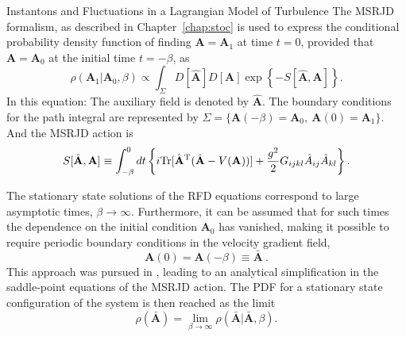 \begin{chapter}{Instantons and Fluctuations in a Lagrangian Model of Turbulence}
The MSRJD formalism, as described in Chapter~\ref{chap:stoc} is used to express the conditional probability density function of finding ${\mathbf{A}} = {\mathbf{A}}_1$ at time $t= 0$, provided that ${\mathbf{A}} = {\mathbf{A}}_0$ at the initial time $t= -\beta$, as
\begin{equation} \label{eq:rhoPDF}
 \rho ( {\mathbf{A}}_1 | {\mathbf{A}}_0, \beta ) \propto \int_{\Sigma} D[\hat {\mathbf{A}}] D[{\mathbf{A}}]  \exp \left\{ -S[\hat {\mathbf{A}}, {\mathbf{A}}] \right\} \mbox{.}
\end{equation}
In this equation: The auxiliary field is denoted by $\hat{\mathbf{A}}$. The boundary conditions for the path integral are represented by $\Sigma = \{ {\mathbf{A}}(-\beta) = {\mathbf{A}}_0, \ {\mathbf{A}}(0) = {\mathbf{A}}_1 \}$. And the MSRJD action is 
\begin{equation} \label{eq:rfd-action}
     S[\hat {\mathbf{A}}, {\mathbf{A}}] \equiv \int_{- \beta}^0 d t \left\{ i \mathrm{Tr}[\hat {\mathbf{A}}^{\mathrm{T}} ( \dot{\mathbf{A}} - V({\mathbf{A}}) ) ]
     + \frac{g^2}{2} G_{ijkl} \hat A_{ij} \hat A_{kl} \right\} \mbox{.}
\end{equation}

The stationary state solutions of the RFD equations correspond to large asymptotic times, $\beta \rightarrow \infty$. Furthermore, it can be assumed that for such times the dependence on the initial condition ${\mathbf{A}}_0$ has vanished, making it possible to require periodic boundary conditions in the velocity gradient field,
\begin{equation} \label{eq:boundary}
 {\mathbf{A}}(0) = {\mathbf{A}}(- \beta) \equiv \bar {\mathbf{A}} \ .
\end{equation}
This approach was pursued in \textcite{moriconi2014}, leading to an analytical simplification in the saddle-point equations of the MSRJD action.
The PDF for a stationary state configuration of the system is then reached as the limit
\begin{equation} \label{asymptPDF}
 \rho(\bar {\mathbf{A}}) = \lim_{\beta \rightarrow \infty} \rho(\bar {\mathbf{A}} | \bar {\mathbf{A}}, \beta) \mbox{.}
\end{equation}


\end{chapter}
